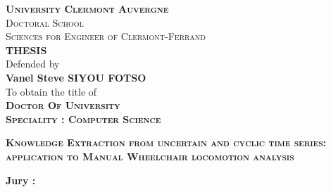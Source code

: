 \begin{titlepage}
\begin{center}
\large{ \textbf{ \textsc{University Clermont Auvergne} } }\\
\large{ \textsc{Doctoral School} }\\
\large{ \textsc{Sciences for Engineer of Clermont-Ferrand} }\\
\large{ \textbf{ \textsc{THESIS}}}\\
Defended by\\
\large{ \textbf{ Vanel Steve SIYOU FOTSO}}\\
To obtain the title of\\
\large{ \textbf{ \textsc{Doctor Of University}}}\\

\large{ \textbf{\textsc{ Speciality : Computer Science}}}\\

\end{center}
\hrulefill
\begin{center}\bfseries\Huge
    \textsc{Knowledge Extraction from uncertain and cyclic time series: application to Manual Wheelchair locomotion analysis}
\end{center}
\hrulefill
\vspace*{1cm}
    
\begin{center}%
\textbf{ Jury : }\\


\end{center}
\end{titlepage}
